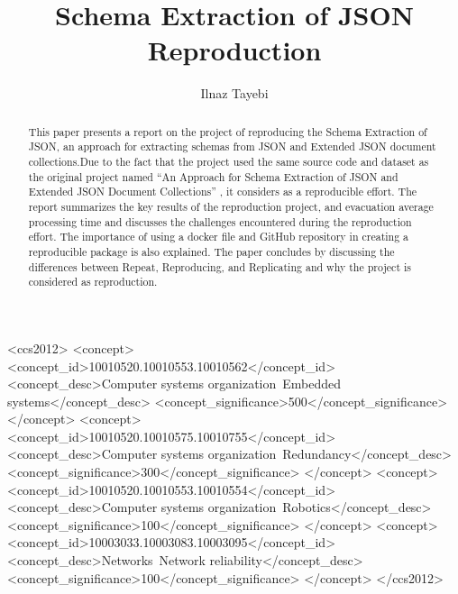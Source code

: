 \documentclass[sigconf]{acmart}
\begin{document}
\twocolumn
\title{Schema Extraction of JSON Reproduction}
\author{Ilnaz Tayebi}
\maketitle
\begin{abstract}
This paper presents a report on the project of reproducing the Schema Extraction of JSON, an approach for extracting schemas from JSON and Extended JSON document collections.Due to the fact that the project used the same source code \cite{JSONSchemaDiscovery2013} and dataset as the original project named ``An Approach for Schema Extraction of JSON and Extended JSON Document Collections'' \cite{8424731}, it considers as a reproducible effort. The report summarizes the key results of the reproduction project, and evacuation average processing time and discusses the challenges encountered during the reproduction effort. The importance of using a docker file and GitHub repository in creating a reproducible package is also explained. The paper concludes by discussing the differences between Repeat, Reproducing, and Replicating and why the project is considered as reproduction.
 \end{abstract}
\begin{CCSXML}
<ccs2012>
 <concept>
  <concept_id>10010520.10010553.10010562</concept_id>
  <concept_desc>Computer systems organization~Embedded systems</concept_desc>
  <concept_significance>500</concept_significance>
 </concept>
 <concept>
  <concept_id>10010520.10010575.10010755</concept_id>
  <concept_desc>Computer systems organization~Redundancy</concept_desc>
  <concept_significance>300</concept_significance>
 </concept>
 <concept>
  <concept_id>10010520.10010553.10010554</concept_id>
  <concept_desc>Computer systems organization~Robotics</concept_desc>
  <concept_significance>100</concept_significance>
 </concept>
 <concept>
  <concept_id>10003033.10003083.10003095</concept_id>
  <concept_desc>Networks~Network reliability</concept_desc>
  <concept_significance>100</concept_significance>
 </concept>
</ccs2012>
\end{CCSXML}

\end{document}
